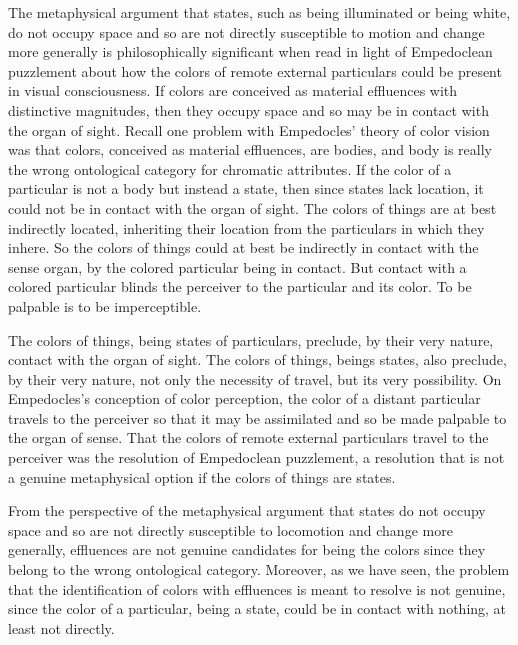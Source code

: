 The metaphysical argument that states, such as being illuminated or being white, do not occupy space and so are not directly susceptible to motion and change more generally is philosophically significant when read in light of Empedoclean puzzlement about how the colors of remote external particulars could be present in visual consciousness. If colors are conceived as material effluences with distinctive magnitudes, then they occupy space and so may be in contact with the organ of sight. Recall one problem with Empedocles' theory of color vision was that colors, conceived as material effluences, are bodies, and body is really the wrong ontological category for chromatic attributes. If the color of a particular is not a body but instead a state, then since states lack location, it could not be in contact with the organ of sight. The colors of things are at best indirectly located, inheriting their location from the particulars in which they inhere. So the colors of things could at best be indirectly in contact with the sense organ, by the colored particular being in contact. But contact with a colored particular blinds the perceiver to the particular and its color. To be palpable is to be imperceptible.

The colors of things, being states of particulars, preclude, by their very nature, contact with the organ of sight. The colors of things, beings states, also preclude, by their very nature, not only the necessity of travel, but its very possibility. On Empedocles's conception of color perception, the color of a distant particular travels to the perceiver so that it may be assimilated and so be made palpable to the organ of sense. That the colors of remote external particulars travel to the perceiver was the resolution of Empedoclean puzzlement, a resolution that is not a genuine metaphysical option if the colors of things are states. 

From the perspective of the metaphysical argument that states do not occupy space and so are not directly susceptible to locomotion and change more generally, effluences are not genuine candidates for being the colors since they belong to the wrong ontological category. Moreover, as we have seen, the problem that the identification of colors with effluences is meant to resolve is not genuine, since the color of a particular, being a state, could be in contact with nothing, at least not directly.

